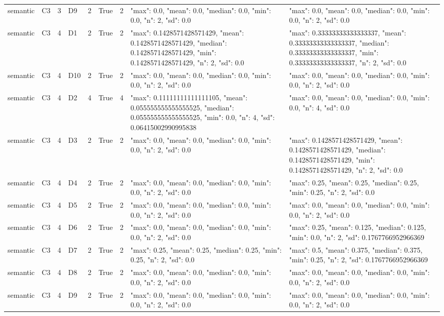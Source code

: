 \begin{tabular}{lllllllll}
semantic & C3 & 3 & D9 & 2 & True & 2 & {"max": 0.0, "mean": 0.0, "median": 0.0, "min": 0.0, "n": 2, "sd": 0.0} & {"max": 0.0, "mean": 0.0, "median": 0.0, "min": 0.0, "n": 2, "sd": 0.0} \\
semantic & C3 & 4 & D1 & 2 & True & 2 & {"max": 0.1428571428571429, "mean": 0.1428571428571429, "median": 0.1428571428571429, "min": 0.1428571428571429, "n": 2, "sd": 0.0} & {"max": 0.33333333333333337, "mean": 0.33333333333333337, "median": 0.33333333333333337, "min": 0.33333333333333337, "n": 2, "sd": 0.0} \\
semantic & C3 & 4 & D10 & 2 & True & 2 & {"max": 0.0, "mean": 0.0, "median": 0.0, "min": 0.0, "n": 2, "sd": 0.0} & {"max": 0.0, "mean": 0.0, "median": 0.0, "min": 0.0, "n": 2, "sd": 0.0} \\
semantic & C3 & 4 & D2 & 4 & True & 4 & {"max": 0.11111111111111105, "mean": 0.055555555555555525, "median": 0.055555555555555525, "min": 0.0, "n": 4, "sd": 0.06415002990995838} & {"max": 0.0, "mean": 0.0, "median": 0.0, "min": 0.0, "n": 4, "sd": 0.0} \\
semantic & C3 & 4 & D3 & 2 & True & 2 & {"max": 0.0, "mean": 0.0, "median": 0.0, "min": 0.0, "n": 2, "sd": 0.0} & {"max": 0.1428571428571429, "mean": 0.1428571428571429, "median": 0.1428571428571429, "min": 0.1428571428571429, "n": 2, "sd": 0.0} \\
semantic & C3 & 4 & D4 & 2 & True & 2 & {"max": 0.0, "mean": 0.0, "median": 0.0, "min": 0.0, "n": 2, "sd": 0.0} & {"max": 0.25, "mean": 0.25, "median": 0.25, "min": 0.25, "n": 2, "sd": 0.0} \\
semantic & C3 & 4 & D5 & 2 & True & 2 & {"max": 0.0, "mean": 0.0, "median": 0.0, "min": 0.0, "n": 2, "sd": 0.0} & {"max": 0.0, "mean": 0.0, "median": 0.0, "min": 0.0, "n": 2, "sd": 0.0} \\
semantic & C3 & 4 & D6 & 2 & True & 2 & {"max": 0.0, "mean": 0.0, "median": 0.0, "min": 0.0, "n": 2, "sd": 0.0} & {"max": 0.25, "mean": 0.125, "median": 0.125, "min": 0.0, "n": 2, "sd": 0.1767766952966369} \\
semantic & C3 & 4 & D7 & 2 & True & 2 & {"max": 0.25, "mean": 0.25, "median": 0.25, "min": 0.25, "n": 2, "sd": 0.0} & {"max": 0.5, "mean": 0.375, "median": 0.375, "min": 0.25, "n": 2, "sd": 0.1767766952966369} \\
semantic & C3 & 4 & D8 & 2 & True & 2 & {"max": 0.0, "mean": 0.0, "median": 0.0, "min": 0.0, "n": 2, "sd": 0.0} & {"max": 0.0, "mean": 0.0, "median": 0.0, "min": 0.0, "n": 2, "sd": 0.0} \\
semantic & C3 & 4 & D9 & 2 & True & 2 & {"max": 0.0, "mean": 0.0, "median": 0.0, "min": 0.0, "n": 2, "sd": 0.0} & {"max": 0.0, "mean": 0.0, "median": 0.0, "min": 0.0, "n": 2, "sd": 0.0} \\

\end{tabular}

